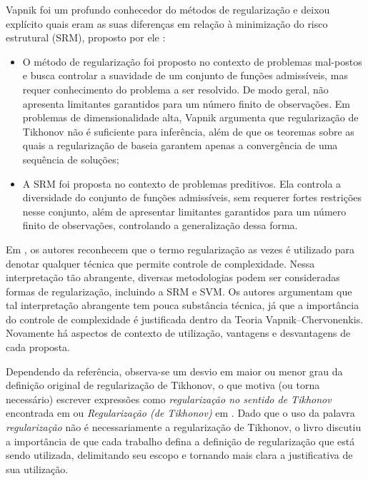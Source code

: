 Vapnik foi um profundo conhecedor do métodos de regularização e deixou explícito quais eram as suas diferenças em relação à minimização do risco estrutural (SRM), proposto por ele \cite[págs. 419--21, 476--7]{Vapnik2006}: 
\begin{itemize}
\item O método de regularização foi proposto no contexto de problemas mal-postos e busca controlar a suavidade de um conjunto de funções admissíveis, mas requer conhecimento do problema a ser resolvido. De modo geral, não apresenta limitantes garantidos para um número finito de observações. Em problemas de dimensionalidade alta, Vapnik argumenta que regularização de Tikhonov não é suficiente para inferência, além de que os teoremas sobre as quais a regularização de baseia garantem apenas a convergência de uma sequência de soluções; 
\item A SRM foi proposta no contexto de problemas preditivos. Ela controla a diversidade do conjunto de funções admissíveis, sem requerer fortes restrições nesse conjunto, além de apresentar limitantes garantidos para um número finito de observações, controlando a generalização dessa forma. 
\end{itemize}
Em \cite[págs. 968--9]{Cherkassky2009}, os autores reconhecem que o termo regularização as vezes é utilizado para denotar qualquer técnica que permite controle de complexidade. Nessa interpretação tão abrangente, diversas metodologias podem ser consideradas formas de regularização, incluindo a SRM e SVM. Os autores argumentam que tal interpretação abrangente tem pouca substância técnica, já que a importância do controle de complexidade é justificada dentro da Teoria Vapnik–Chervonenkis. Novamente há aspectos de contexto de utilização, vantagens e desvantagens de cada proposta. 


Dependendo da referência, observa-se um desvio em maior ou menor grau da definição original de regularização de Tikhonov, o que motiva (ou torna necessário) escrever expressões como \textit{regularização no sentido de Tikhonov} encontrada em \cite{Bertero2021} ou \textit{Regularização (de Tikhonov)} em \cite{Gerth2021}. Dado que o uso da palavra \textit{regularização} não é necessariamente a regularização de Tikhonov, o livro discutiu a importância de que cada trabalho defina a definição de regularização que está sendo utilizada, delimitando seu escopo e tornando mais clara a justificativa de sua utilização.